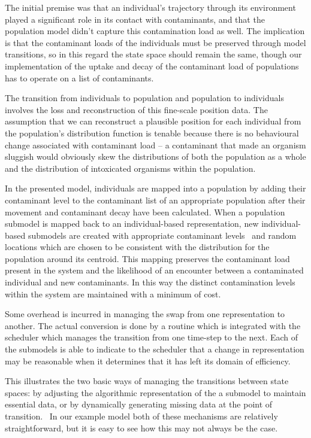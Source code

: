 \documentclass{article}
\begin{document}
The initial premise was that an individual's trajectory through its
environment played a significant role in its contact with contaminants, and
that the population model didn't capture this contamination load as well. The
implication is that the contaminant loads of the individuals must be preserved
through model transitions, so in this regard the state space should remain the
same, though our implementation of the uptake and decay of the contaminant
load of populations has to operate on a list of contaminants.

The transition from individuals to population and population to individuals
involves the loss and reconstruction of this fine-scale position data. The
assumption that we can reconstruct a plausible position for each individual
from the population's distribution function is tenable because there is no
behavioural change associated with contaminant load -- a contaminant that made
an organism sluggish would obviously skew the distributions of both the
population as a whole and the distribution of intoxicated organisms within the
population.

In the presented model, individuals are mapped into a population by adding
their contaminant level to the contaminant list of an appropriate population
after their movement and contaminant decay have been calculated. When a
population submodel is mapped back to an individual-based representation, new
individual-based submodels are created with appropriate contaminant levels \
and random locations which are chosen to be consistent with the distribution
for the population around its centroid. This mapping preserves the contaminant
load present in the system and the likelihood of an encounter between a
contaminated individual and new contaminants. In this way the distinct
contamination levels within the system are maintained with a minimum of cost.

Some overhead is incurred in managing the swap from one representation to
another. The actual conversion is done by a routine which is integrated with
the scheduler which manages the transition from one time-step to the next.
Each of the submodels is able to indicate to the scheduler that a change in
representation may be reasonable when it determines that it has left its
domain of efficiency.

This illustrates the two basic ways of managing the transitions between state
spaces: by adjusting the algorithmic representation of the a submodel to
maintain essential data, or by dynamically generating missing data at the
point of transition. \ In our example model both of these mechanisms are
relatively straightforward, but it is easy to see how this may not always be
the case.
\end{document}
